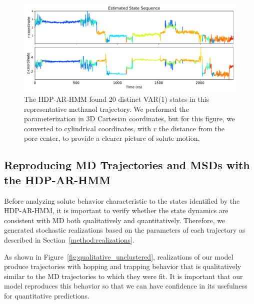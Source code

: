 \documentclass[journal=jpcbfk,manuscript=article]{achemso}
\begin{document}
  \begin{figure}
  \centering
  \includegraphics[width=\textwidth]{rz_unclustered_MET.pdf}
  \caption{The HDP-AR-HMM found 20 distinct VAR(1) states in this representative methanol trajectory.
  We performed the parameterization in 3D Cartesian coordinates, but for this figure, we 
  converted to cylindrical coordinates, with $r$ the distance from the pore center, to 
  provide a clearer picture of solute motion.}\label{fig:rz_unclustered}
  \end{figure}
  
  \subsection{Reproducing MD Trajectories and MSDs with the HDP-AR-HMM}\label{section:unclustered_MSD_prediction}

  Before analyzing solute behavior characteristic to the states identified by the
  HDP-AR-HMM, it is important to verify whether the state dynamics are consistent with MD
  both qualitatively and quantitatively. Therefore, we generated stochastic 
  realizations based on the parameters of each trajectory as described in 
  Section~\ref{method:realizations}.
  
  As shown in Figure~\ref{fig:qualitative_unclustered}, realizations of our model 
  produce trajectories with hopping and trapping behavior that is qualitatively 
  similar to the MD trajectories to which they were fit. It is important that our
  model reproduces this behavior so that we can have confidence in its usefulness
  for quantitative predictions.
  
\end{document}
